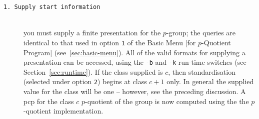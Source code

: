 \documentclass[12pt]{article}
\def\pq{the $p$-quotient implementation}
\begin{document}
\begin{description}
\item[\texttt{1.\ Supply start information}]\ \\
 you must supply a finite presentation
 for the $p$-group; the queries are identical to that used in
 option \texttt{1} of the Basic Menu [for $p$-Quotient Program] 
 (see~\ref{sec:basic-menu}). All of the valid formats for
 supplying a presentation can be accessed, 
 using the \texttt{-b} and \texttt{-k} run-time switches 
 (see Section~\ref{sec:runtime}). 
 If the class supplied is $c$, then standardisation 
 (selected under option \texttt{2}) begins at class $c + 1$ only. 
 In general the supplied value for the class will be one -- 
 however, see the preceding discussion. 
 A pcp for the class $c$ $p$-quotient of the group
 is now computed using the \pq. 


\end{description}
\end{document}
